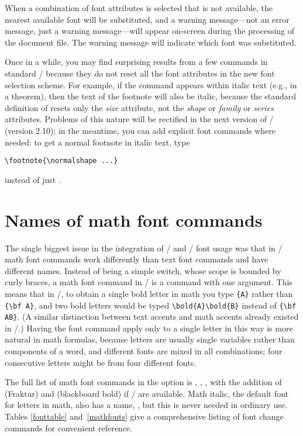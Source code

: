 When a combination of font attributes is selected that is
not available, the nearest available font will be substituted,
and a warning message---not an error message, just a warning
message---will appear on-screen during the processing of
the document file.  The warning message will indicate which
font was substituted.

Once in a while,
you may find surprising results from a few commands in standard
\latex/  because they do not reset all the font attributes in the new
font selection scheme.  For example, if the  command
appears within italic text (e.g., in a theorem), then the text of the
footnote will also be italic, because the standard definition of
 resets only the {\em size\/} attribute, not the {\em
shape\/} or {\em family\/} or {\em series\/} attributes.  Problems
of this nature
will be rectified in the next version of \latex/ (version 2.10); 
in the meantime, you can add
explicit font commands where needed: to get a normal
footnote in italic text, type
\begin{verbatim}
\footnote{\normalshape ...}
\end{verbatim}
instead of just .

\section{Names of math font commands}
\label{s:mathfonts}

The single biggest issue in the integration of \amstex/ and \latex/ font
usage was that in \amstex/ math font commands work
differently than text font commands and have different names. Instead
of being a simple switch, whose scope is bounded by curly braces, a math
font command in \amstex/ is a command with one argument.  This means that
in \amslatex/, to obtain a single bold letter in math you type 
\verb"{A}" rather than \verb"{\bf A}", and two bold letters would
be typed \verb"\bold{A}"\5\verb"\bold{B}" instead of \verb"{\bf AB}".
(A similar distinction between text accents and math accents
 already existed in \latex/.)
Having the font command apply only to a single letter in this way
is more natural in math formulas, because
letters are usually single variables rather
than components of a word, and different fonts are mixed in all
combinations; four consecutive letters might be from four different
fonts.

The full list of math font commands in the  option is
, , , with the addition of 
(Fraktur) and  (blackboard bold) if \amsfonts/ are available. 
Math italic, the default font for letters in math, also has a name,
, but this is never needed in ordinary use.  Tables
\ref{fonttable} and~\ref{mathfonts} give a comprehensive listing of
font change commands for convenient reference.

